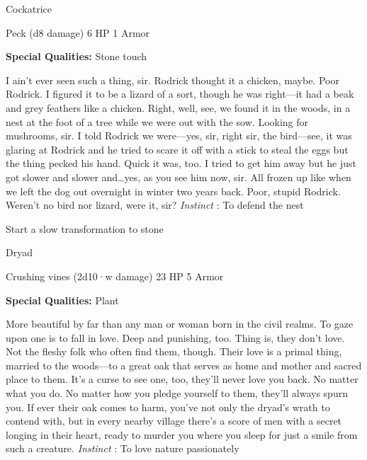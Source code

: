 \startMonsterName
Cockatrice	 
\stopMonsterName
       

Peck (d8 damage)	6 HP	1 Armor

       


       
\startMonsterQualities
         {\bf Special Qualities:}  Stone touch
\stopMonsterQualities
       
\startMonsterDescription
I ain’t ever seen such a thing, sir. Rodrick thought it a chicken, maybe. Poor Rodrick. I figured it to be a lizard of a sort, though he was right—it had a beak and grey feathers like a chicken. Right, well, see, we found it in the woods, in a nest at the foot of a tree while we were out with the sow. Looking for mushrooms, sir. I told Rodrick we were—yes, sir, right sir, the bird—see, it was glaring at Rodrick and he tried to scare it off with a stick to steal the eggs but the thing pecked his hand. Quick it was, too. I tried to get him away but he just got slower and slower and…yes, as you see him now, sir. All frozen up like when we left the dog out overnight in winter two years back. Poor, stupid Rodrick. Weren’t no bird nor lizard, were it, sir? {\em Instinct} : To defend the nest
\stopMonsterDescription
       
\startitemize[1,packed]
         
\item Start a slow transformation to stone

       
\stopitemize
       
\startMonsterName
Dryad	 
\stopMonsterName
       

Crushing vines (2d10·w damage)	23 HP	5 Armor

       


       
\startMonsterQualities
         {\bf Special Qualities:}  Plant
\stopMonsterQualities
       
\startMonsterDescription
More beautiful by far than any man or woman born in the civil realms. To gaze upon one is to fall in love. Deep and punishing, too. Thing is, they don’t love. Not the fleshy folk who often find them, though. Their love is a primal thing, married to the woods—to a great oak that serves as home and mother and sacred place to them. It’s a curse to see one, too, they’ll never love you back. No matter what you do. No matter how you pledge yourself to them, they’ll always spurn you. If ever their oak comes to harm, you’ve not only the dryad’s wrath to contend with, but in every nearby village there’s a score of men with a secret longing in their heart, ready to murder you where you sleep for just a smile from such a creature. {\em Instinct} : To love nature passionately
\stopMonsterDescription
       
